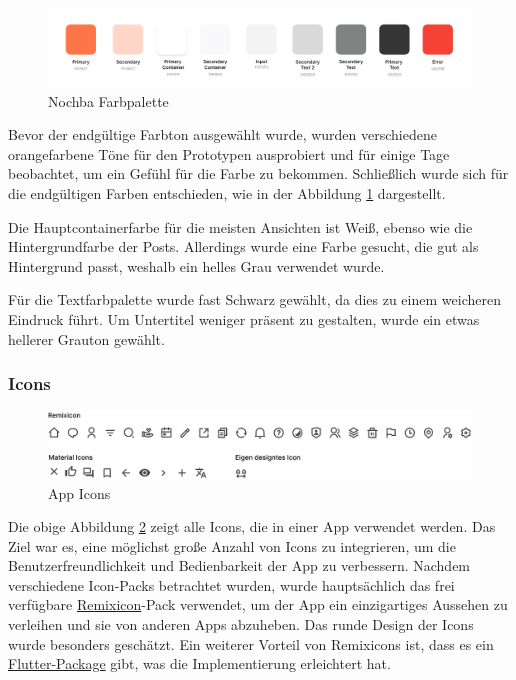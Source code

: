 \begin{figure}[h]
  \centering
  \includegraphics[width=1\textwidth]{pics/colors.png}
  \caption{Nochba Farbpalette}
  \label{fig:color-chart}
\end{figure}

Bevor der endgültige Farbton ausgewählt wurde, wurden verschiedene orangefarbene Töne für den Prototypen ausprobiert und für einige Tage beobachtet, um ein Gefühl für die Farbe zu bekommen. Schließlich wurde sich für die endgültigen Farben entschieden, wie in der Abbildung \ref{fig:color-chart} dargestellt.

Die Hauptcontainerfarbe für die meisten Ansichten ist Weiß, ebenso wie die Hintergrundfarbe der Posts. Allerdings wurde eine Farbe gesucht, die gut als Hintergrund passt, weshalb ein helles Grau verwendet wurde.

Für die Textfarbpalette wurde fast Schwarz gewählt, da dies zu einem weicheren Eindruck führt. Um Untertitel weniger präsent zu gestalten, wurde ein etwas hellerer Grauton gewählt.


\subsubsection{Icons}


\begin{figure}[ht]
  \centering
  \includegraphics[width=1\textwidth]{pics/icons.png}
  \caption{App Icons}
  \label{fig:app-icons}
\end{figure}

Die obige Abbildung \ref{fig:app-icons} zeigt alle Icons,
die in einer App verwendet werden. Das Ziel war es, eine
möglichst große Anzahl von Icons zu integrieren, um die
Benutzerfreundlichkeit und Bedienbarkeit der App zu
verbessern. Nachdem verschiedene Icon-Packs betrachtet
wurden, wurde hauptsächlich das frei verfügbare
\href{https://github.com/Remix-Design/remixicon}{Remixicon}-Pack
verwendet, um der App ein einzigartiges Aussehen zu
verleihen und sie von anderen Apps abzuheben. Das runde
Design der Icons wurde besonders geschätzt. Ein weiterer
Vorteil von Remixicons ist, dass es ein
\href{https://pub.dev/packages/remixicon}{Flutter-Package}
gibt, was
die Implementierung erleichtert hat.

